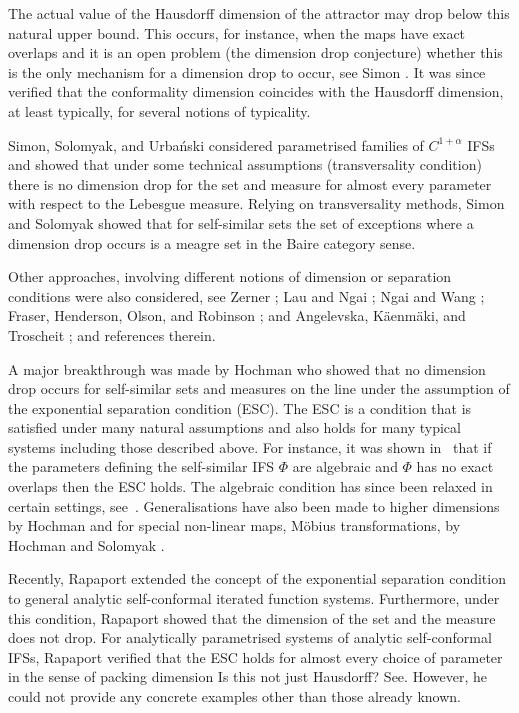 \documentclass[12pt,]{article}
\theoremstyle{definition}
\theoremstyle{remark}
\newcommand{\0}{\mathbf{0}}
\begin{document}
The actual value of the Hausdorff dimension of the attractor may drop below this natural upper
bound. This occurs, for instance, when the maps have exact overlaps and it is an open problem (the
dimension drop conjecture) whether this is the only mechanism for a dimension drop to occur, see
Simon \cite{Simon1996}.  It was since verified that the conformality dimension coincides with the
Hausdorff dimension, at least typically, for several notions of typicality.

Simon, Solomyak, and Urba\'nski \cite{SimonSolomyakUrbanski2,SimonSolomyakUrbanski1} considered
parametrised families of $C^{1+\alpha}$ IFSs and showed that under some technical assumptions
(transversality condition) there is no dimension drop for the set and measure for almost every
parameter with respect to the Lebesgue measure. Relying on transversality methods, Simon and
Solomyak \cite{SimonSolomyak02} showed that for self-similar sets the set of exceptions where a
dimension drop occurs is a meagre set in the Baire category sense. 

Other approaches, involving different notions of dimension or separation conditions were also
considered, see
Zerner \cite{Zerner1996}; Lau and Ngai \cite{LauNgai1999}; Ngai and Wang \cite{NgaiWang2001}; Fraser,
Henderson, Olson, and Robinson \cite{FHOR2015}; and Angelevska, K\"aenm\"aki, and Troscheit
\cite{AngelevskaKaenmakiTroscheit2020}; and references therein.

A major breakthrough was made by Hochman \cite{Hochman_SelfSimESC_Annals} who showed that no
dimension drop occurs for self-similar sets and measures on the line under the
assumption of the exponential separation condition (ESC).
The ESC is a condition that is satisfied under many natural assumptions and also holds for many typical
systems including those described above. 
For instance, it was shown in~\cite{Hochman_SelfSimESC_Annals}
that if the parameters defining the self-similar IFS $\Phi$ are algebraic and $\Phi$ has no exact
overlaps then the ESC holds. The algebraic condition has since been relaxed in certain settings,
see~\cite{FengFeng_DimHomoIFSAlgebraicTrans_arxiv, Rapaport_ExactOverlapsAlgebraicContr,
RapaportVarju_Duke24, Varju_BernConv_Annals19}.
Generalisations have also been made to higher dimensions by Hochman \cite{Hochman2017} and for special non-linear
maps, M\"obius transformations, by Hochman and Solomyak \cite{HochmanSolomyak_Invent17}.


Recently, Rapaport \cite{Rapaport_SelfConfESC25arXiv} extended the concept of the exponential
separation condition to general
analytic self-conformal iterated function systems. Furthermore, under this condition, Rapaport
showed that the dimension of the set and the measure does not drop.
For analytically parametrised systems of analytic self-conformal IFSs, Rapaport verified that the
ESC holds for almost every choice of parameter in the sense of packing dimension {\color{red}Is this not just Hausdorff? See\cite[Corollay 1.4]{Rapaport_SelfConfESC25arXiv}}.
However, he could not provide any concrete examples other than those already known.
\end{document}
